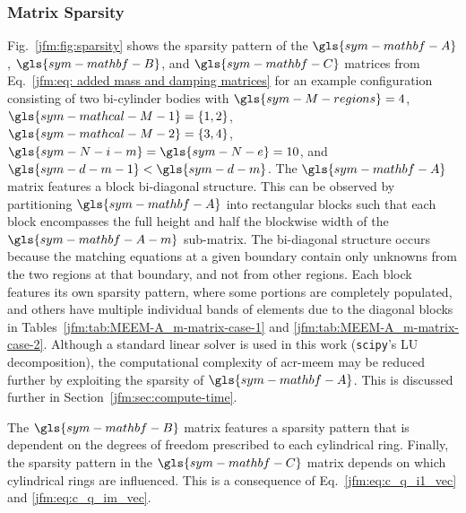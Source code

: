 \documentclass[lineno]{JFM-FLM_Au}
\begin{document}
\subsubsection{Matrix Sparsity}
Fig.~\ref{jfm:fig:sparsity} shows the sparsity pattern of the $\gls{sym-mathbf-A}$, $\gls{sym-mathbf-B}$, and $\gls{sym-mathbf-C}$ matrices from Eq.~\ref{jfm:eq: added mass and damping matrices} for an example configuration consisting of two bi-cylinder bodies with $\gls{sym-M-regions}=4$, $\gls{sym-mathcal-M-1} = \{1, 2\}$, $\gls{sym-mathcal-M-2} = \{3, 4\}$, $\gls{sym-N-i-m}=\gls{sym-N-e}=10$, and $\gls{sym-d-m-1}<\gls{sym-d-m}$. 
The $\gls{sym-mathbf-A}$ matrix features a block bi-diagonal structure.
This can be observed by partitioning $\gls{sym-mathbf-A}$ into rectangular blocks such that each block encompasses the full height and half the blockwise width of the $\gls{sym-mathbf-A-m}$ sub-matrix.
The bi-diagonal structure occurs because the matching equations at a given boundary contain only unknowns from the two regions at that boundary, and not from other regions.
Each block features its own sparsity pattern, where some portions are completely populated, 
and others have multiple individual bands of elements due to the diagonal blocks in Tables~\ref{jfm:tab:MEEM-A_m-matrix-case-1} and \ref{jfm:tab:MEEM-A_m-matrix-case-2}. 
Although a standard linear solver is used in this work (\texttt{scipy}'s LU decomposition), 
the computational complexity of \gls{acr-meem} may be reduced further by exploiting the sparsity of $\gls{sym-mathbf-A}$. 
This is discussed further in Section~\ref{jfm:sec:compute-time}.

The $\gls{sym-mathbf-B}$ matrix features a sparsity pattern that is dependent on the degrees of freedom prescribed to each cylindrical ring. 
Finally, the sparsity pattern in the $\gls{sym-mathbf-C}$ matrix depends on which cylindrical rings are influenced. 
This is a consequence of Eq.~\ref{jfm:eq:c_q_i1_vec} and \ref{jfm:eq:c_q_im_vec}.
\end{document}
